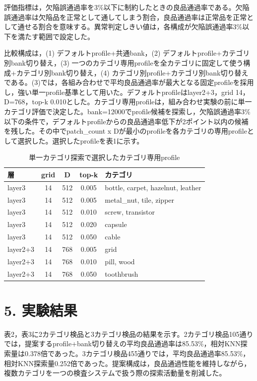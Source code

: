 \documentclass[a4paper,twocolumn,10pt]{ltjsarticle}
\begin{document}
評価指標は，欠陥誤通過率を3\%以下に制約したときの良品通過率である。欠陥誤通過率は欠陥品を正常として通してしまう割合，良品通過率は正常品を正常として通せる割合を意味する。異常判定しきい値は，各構成が欠陥誤通過率3\%以下を満たす範囲で設定した。

比較構成は，(1) デフォルトprofile+共通bank，(2) デフォルトprofile+カテゴリ別bank切り替え，(3) 一つのカテゴリ専用profileを全カテゴリに固定して使う構成+カテゴリ別bank切り替え，(4) カテゴリ別profile+カテゴリ別bank切り替えである。(3)では，各組み合わせで平均良品通過率が最大となる固定profileを採用し，強い単一profile基準として用いた。デフォルトprofileはlayer2+3，grid 14，D=768，top-k 0.010とした。カテゴリ専用profileは，組み合わせ実験の前に単一カテゴリ評価で決定した。bank=12000でprofile候補を探索し，欠陥誤通過率3\%以下の条件で，デフォルトprofileからの良品通過率低下が2ポイント以内の候補を残した。その中でpatch\_count x Dが最小のprofileを各カテゴリの専用profileとして選択した。選択したprofileを表1に示す。

\begin{table}[h]\centering\small
\caption{単一カテゴリ探索で選択したカテゴリ専用profile}
\begin{tabular}{lcccl}\toprule 層 & grid & D & top-k & カテゴリ\\\midrule
layer3 & 14 & 512 & 0.005 & bottle, carpet, hazelnut, leather\\
layer3 & 14 & 512 & 0.005 & metal\_nut, tile, zipper\\
layer3 & 14 & 512 & 0.010 & screw, transistor\\
layer3 & 14 & 512 & 0.020 & capsule\\
layer3 & 14 & 512 & 0.050 & cable\\
layer2+3 & 14 & 768 & 0.005 & grid\\
layer2+3 & 14 & 768 & 0.010 & pill, wood\\
layer2+3 & 14 & 768 & 0.050 & toothbrush\\
\bottomrule\end{tabular}\end{table}
\section*{5. 実験結果}
表2，表3に2カテゴリ検品と3カテゴリ検品の結果を示す。2カテゴリ検品105通りでは，提案するprofile+bank切り替えの平均良品通過率は85.53\%，相対KNN探索量は0.378倍であった。3カテゴリ検品455通りでは，平均良品通過率85.53\%，相対KNN探索量0.252倍であった。提案構成は，良品通過性能を維持しながら，複数カテゴリを一つの検査システムで扱う際の探索活動量を削減した。
\end{document}
